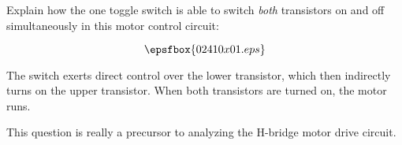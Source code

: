 

Explain how the one toggle switch is able to switch {\it both} transistors on and off simultaneously in this motor control circuit:

$$\epsfbox{02410x01.eps}$$







The switch exerts direct control over the lower transistor, which then indirectly turns on the upper transistor.  When both transistors are turned on, the motor runs.







This question is really a precursor to analyzing the H-bridge motor drive circuit.




